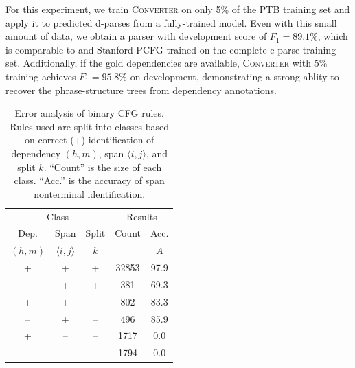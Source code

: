 \documentclass[11pt,letterpaper]{article}
\newcommand{\Span}[1]{\langle #1 \rangle}
\newcommand{\ParseName}{\textsc{Converter}\xspace}
\begin{document}
For this experiment, we train \ParseName on only 5\% of the PTB training set and apply it to predicted d-parses from a fully-trained model. Even with this small amount of 
data, we obtain a parser with development score of  $F_1 = 89.1\%$, which is comparable to  and Stanford PCFG \cite{klein2003accurate} trained on the complete c-parse training set. Additionally, if the gold dependencies are available, \ParseName{} with 5\% training achieves $F_1 = 95.8\%$ on development, demonstrating a strong ablity to recover the phrase-structure trees from dependency annotations.










\begin{table}
  \centering
  \footnotesize
  \begin{tabular}{ccccc}
    \toprule
    \multicolumn{3}{c}{Class} & \multicolumn{2}{c}{Results} \\
    Dep. & Span & Split & Count & Acc.  \\ 
    $(h, m)$ & $\Span{i,j}$ & $k$ &  & $A$ \\ 
    \midrule
    + & + & +  &  32853 &  97.9   \\ 
    -- & + & +  &  381 & 69.3   \\ 
    + & + & --  &  802   & 83.3   \\ 
    -- & + & --  &  496 & 85.9   \\ 
    + & -- & --  &  1717 & 0.0    \\ 
    -- & -- & --  &  1794 & 0.0    \\ 
    \bottomrule
  \end{tabular}
  \caption{Error analysis of binary CFG rules. Rules used are split into classes based on 
    correct (+) identification of dependency $(h,m)$, span $\Span{i,j}$, and split $k$. 
    ``Count'' is the size of each class. ``Acc.'' is the accuracy of span nonterminal identification. \label{tab:analysis}}
\end{table}
\end{document}
